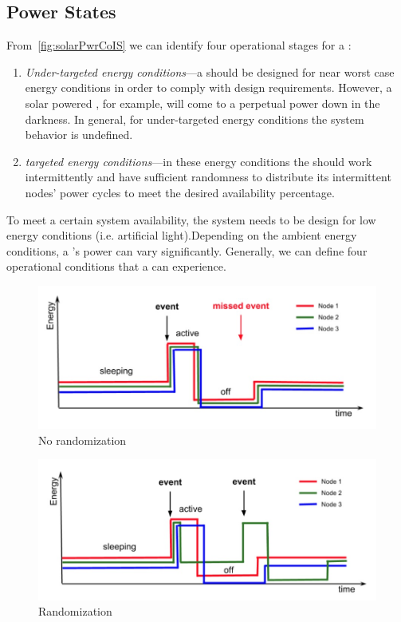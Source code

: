 \subsection{Power States}
From~\ref{fig:solarPwrCoIS} we can identify four operational stages for a \sys:
\begin{enumerate}
		\item \textit{Under-targeted energy conditions}---a \sys should be designed for near worst case energy conditions in order to comply with design requirements. However, a solar powered \sys, for example,  will come to a perpetual power down in the darkness. In general, for under-targeted energy conditions the system behavior is undefined.
		\item \textit{targeted energy conditions}---in these energy conditions the \sys should work intermittently and have sufficient randomness to distribute its intermittent nodes' power cycles to meet the desired availability percentage. 
\end{enumerate}


To meet a certain system availability, the system needs to be design for low energy conditions (i.e. artificial light).Depending on the ambient energy conditions, a \sys's power can vary significantly.  Generally, we can define four operational conditions that a \sys can experience.

\begin{figure}
		\centering
		\includegraphics[width=\columnwidth]{figures/noRandomization}
		\caption{ No randomization}
		\label{fig:noRand}
\end{figure} 

\begin{figure}
		\centering
		\includegraphics[width=\columnwidth]{figures/randomization}
		\caption{ Randomization}
		\label{fig:noRand}
\end{figure} 

